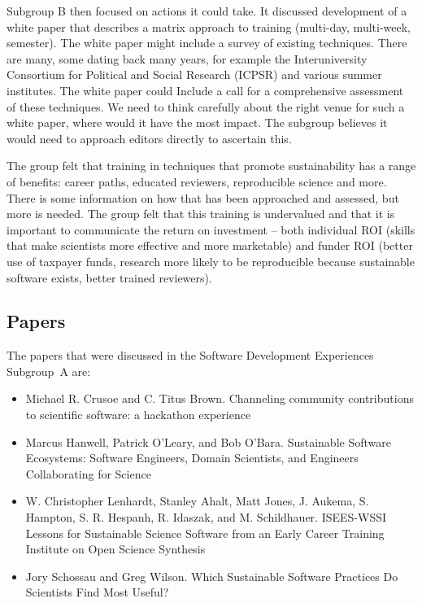 \documentclass[11pt, oneside]{amsart}
\begin{document}
Subgroup B then focused on actions it could take. It discussed development of a
white paper that describes a matrix approach to training (multi-day, multi-week,
semester). The white paper might include a survey of existing techniques. There
are many, some dating back many years, for example the Interuniversity
Consortium for Political and Social Research (ICPSR) and various summer
institutes. The white paper could Include a call for a comprehensive assessment
of these techniques. We need to think carefully about the right venue for such a
white paper, where would it have the most impact. The subgroup believes it would
need to approach editors directly to ascertain this.

The group felt that training in techniques that promote sustainability has a
range of benefits: career paths, educated reviewers, reproducible science and
more. There is some information on how that has been approached and assessed,
but more is needed. The group felt that this training is undervalued and that it
is important to communicate the return on investment -- both individual ROI
(skills that make scientists more effective and more marketable) and funder ROI
(better use of taxpayer funds, research more likely to be reproducible because
sustainable software exists, better trained reviewers).



\subsection{Papers}
The papers that were discussed in the Software Development Experiences Subgroup~A are:

\begin{itemize}
\item Michael R. Crusoe and C. Titus Brown. Channeling community contributions to
scientific software: a hackathon experience~\cite{wssspe2_crusoe}

\item Marcus Hanwell, Patrick O'Leary, and Bob O'Bara. Sustainable Software
Ecosystems: Software Engineers, Domain Scientists, and Engineers Collaborating
for Science~\cite{wssspe2_hanwell}

\item W. Christopher Lenhardt, Stanley Ahalt, Matt Jones, J. Aukema, S. Hampton,
S. R. Hespanh, R. Idaszak, and M. Schildhauer. {ISEES-WSSI} Lessons for
Sustainable Science Software from an Early Career Training Institute on Open
Science Synthesis~\cite{wssspe2_lenhardt}

\item Jory Schossau and Greg Wilson. Which Sustainable Software Practices Do
Scientists Find Most Useful?~\cite{wssspe2_schossau}

\end{itemize}
\end{document}
